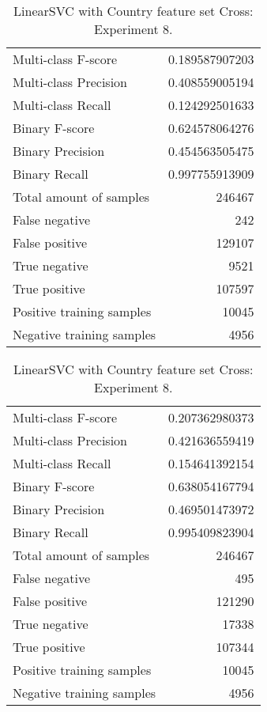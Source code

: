 \begin{table}[H]
\begin{minipage}{0.5\textwidth}
\caption{LinearSVC with Country feature set Cross: Experiment 7.}
\centering
\begin{tabular}{l r}
\toprule
Multi-class F-score & 0.189587907203 \\
Multi-class Precision & 0.408559005194 \\
Multi-class Recall & 0.124292501633 \\
\midrule
Binary F-score & 0.624578064276 \\
Binary Precision & 0.454563505475 \\
Binary Recall & 0.997755913909 \\
\midrule
Total amount of samples & 246467 \\
False negative & 242 \\
False positive & 129107 \\
True negative & 9521 \\
True positive & 107597 \\
\midrule
Positive training samples & 10045 \\
Negative training samples & 4956 \\
\bottomrule
\end{tabular}
\end{minipage}
\hfillx
\begin{minipage}{0.5\textwidth}
\caption{LinearSVC with Country feature set Cross: Experiment 8.}
\centering
\begin{tabular}{l r}
\toprule
Multi-class F-score & 0.207362980373 \\
Multi-class Precision & 0.421636559419 \\
Multi-class Recall & 0.154641392154 \\
\midrule
Binary F-score & 0.638054167794 \\
Binary Precision & 0.469501473972 \\
Binary Recall & 0.995409823904 \\
\midrule
Total amount of samples & 246467 \\
False negative & 495 \\
False positive & 121290 \\
True negative & 17338 \\
True positive & 107344 \\
\midrule
Positive training samples & 10045 \\
Negative training samples & 4956 \\
\bottomrule
\end{tabular}
\end{minipage}
\end{table}
